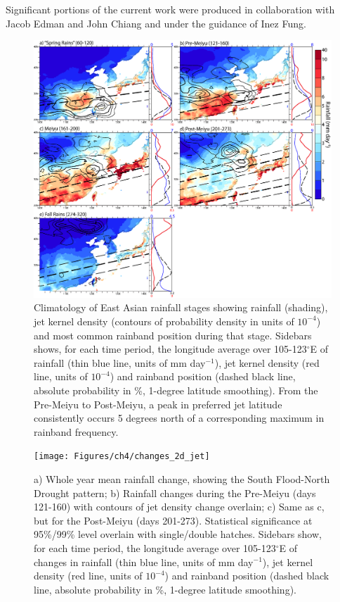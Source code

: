 	Significant portions of the current work were produced in collaboration with Jacob Edman and John Chiang and under the guidance of Inez Fung.


\begin{figure}
\centering
\noindent\includegraphics[width=36pc]{Figures/ch4/climo}
\caption{Climatology of East Asian rainfall stages showing rainfall (shading), jet kernel density (contours of probability density in units of $10^{-4}$) and most common rainband position during that stage. Sidebars shows, for each time period, the longitude average over 105-123$^{\circ}$E of rainfall (thin blue line, units of mm day$^{-1}$), jet kernel density (red line, units of $10^{-4}$) and rainband position (dashed black line, absolute probability in \%, 1-degree latitude smoothing). From the Pre-Meiyu to Post-Meiyu, a peak in preferred jet latitude consistently occurs 5 degrees north of a corresponding maximum in rainband frequency.}
\label{fig:climo}
\end{figure}


\begin{figure}
\centering
\noindent\texttt{[image: Figures/ch4/changes\_2d\_jet]}
\caption{a) Whole year mean rainfall change, showing the South Flood-North Drought pattern; b) Rainfall changes during the Pre-Meiyu (days 121-160) with contours of jet density change overlain; c) Same as c, but for the Post-Meiyu (days 201-273). Statistical significance at 95\%/99\% level overlain with single/double hatches. Sidebars show, for each time period, the longitude average over 105-123$^{\circ}$E of changes in rainfall (thin blue line, units of mm day$^{-1}$), jet kernel density (red line, units of $10^{-4}$) and rainband position (dashed black line, absolute probability in \%, 1-degree latitude smoothing).}
\label{fig:changes_2d}
\end{figure}


